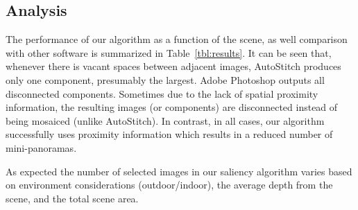 \subsection{Analysis}

The performance of our algorithm as a function of the scene, as well
comparison with other software is summarized in
Table~\ref{tbl:results}.  It can be seen that, whenever there is
vacant spaces between adjacent images, AutoStitch produces only
one component, presumably the largest.  Adobe Photoshop outputs all disconnected
components. Sometimes due to the lack of spatial proximity
information, the resulting images (or components) are disconnected instead of being 
mosaiced (unlike AutoStitch). In contrast, in all cases, our algorithm
successfully uses proximity information which results in a reduced number of mini-panoramas. 

As expected the number of selected images in our saliency algorithm
varies based on environment considerations (outdoor/indoor), the
average depth from the scene, and the total scene area.
 
